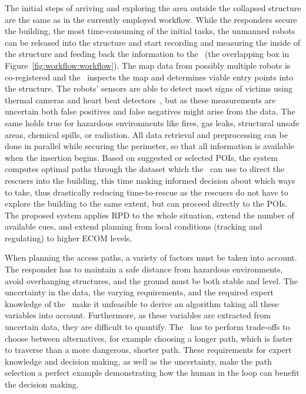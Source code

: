  The initial steps of arriving and exploring the area outside the collapsed structure are the same as in the currently employed workflow. While the responders secure the building, the most time-consuming of the initial tasks, the unmanned robots can be released into the structure and start recording and measuring the inside of the structure and feeding back the information to the \IC\ (the overlapping box in Figure~\ref{fig:workflow:workflow}). The map data from possibly multiple robots is co-registered and the \IC\ inspects the map and determines viable entry points into the structure. The robots' sensors are able to detect most signs of victims using thermal cameras and heart beat detectors~\cite{6027084, Wu12Eulerian}, but as these measurements are uncertain both false positives and false negatives might arise from the data. The same holds true for hazardous environments like fires, gas leaks, structural unsafe areas, chemical spills, or radiation. All data retrieval and preprocessing can be done in parallel while securing the perimeter, so that all information is available when the insertion begins. Based on suggested or selected POIs, the system computes optimal paths through the dataset which the \IC\ can use to direct the rescuers into the building, this time making informed decision about which ways to take, thus drastically reducing time-to-rescue as the rescuers do not have to explore the building to the same extent, but can proceed directly to the POIs. The proposed system applies RPD to the whole situation, extend the number of available cues, and extend planning from local conditions (tracking and regulating) to higher ECOM levels.

When planning the access paths, a variety of factors must be taken into account. The responder has to maintain a safe distance from hazardous environments, avoid overhanging structures, and the ground must be both stable and level. The uncertainty in the data, the varying requirements, and the required expert knowledge of the \IC\ make it unfeasible to derive an algorithm taking all these variables into account. Furthermore, as these variables are extracted from uncertain data, they are difficult to quantify. The \IC\ has to perform trade-offs to choose between alternatives, for example choosing a longer path, which is faster to traverse than a more dangerous, shorter path. These requirements for expert knowledge and decision making, as well as the uncertainty, make the path selection a perfect example demonstrating how the human in the loop can benefit the decision making.

